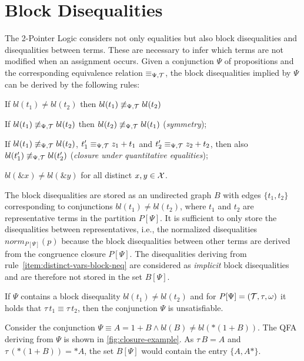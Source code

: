 \section{Block Disequalities}\label{section:block-disequalities}

The 2-Pointer Logic considers not only equalities but also block disequalities and disequalities between terms.
These are necessary to infer which terms are not
modified when an assignment occurs.
Given a conjunction $\Psi$ of propositions and the corresponding equivalence relation $\equiv_{\Psi,\mathcal{T}}$, the block disequalities implied by $\Psi$ can be derived by the following rules:

\begin{enumerate}[label={[B\arabic*]}, ref={[B\arabic*]}]
    \setcounter{enumi}{-1} %
    \item If $bl(t_1)\neq bl(t_2)$ then $bl(t_1)\not\equiv_{\Psi,\mathcal{T}} bl(t_2)$
    \item If $bl(t_1)\not\equiv_{\Psi,\mathcal{T}} bl(t_2)$ then $bl(t_2)\not\equiv_{\Psi,\mathcal{T}} bl(t_1)$
          (\emph{symmetry});
          \item\label{item:closure-under-quantitative-equalities}
          If $bl(t_1)\not\equiv_{\Psi,\mathcal{T}} bl(t_2)$, $t'_1 \equiv_{\Psi,\mathcal{T}} z_1+t_1$ and $t'_2\equiv_{\Psi,\mathcal{T}} z_2+t_2$, then
          also $bl(t'_1)\not\equiv_{\Psi,\mathcal{T}} bl(t'_2)$ (\emph{closure under quantitative equalities});
          \item\label{item:distinct-vars-block-neq} $bl(\&x) \neq bl(\&y)$ for all distinct $x, y \in \mathcal{X}$.
\end{enumerate}

The block disequalities are stored as an undirected graph $B$
with edges $\{t_1,t_2\}$ corresponding to conjunctions $bl(t_1) \neq bl(t_2)$,
where $t_1$ and $t_2$ are representative terms in the partition $P[\Psi]$.
It is sufficient to only store the disequalities between representatives, i.e.,
the normalized disequalities $norm_{P[\Psi]}(p)$ because
the block disequalities between other terms are derived from the congruence closure $P[\Psi]$.
The disequalities deriving from rule~\ref{item:distinct-vars-block-neq} are considered as \emph{implicit} block disequalities and are therefore not stored in the set $B[\Psi]$.

If $\Psi$ contains a block disequality $bl(t_1) \neq bl(t_2)$ and for $P[\Psi] = (\mathcal{T}, \tau, \omega)$ it holds that
$\tau\,t_1 \equiv \tau\,t_2$, then the conjunction $\Psi$ is unsatisfiable.

\begin{example}
    Consider the conjunction $\Psi \equiv A = 1 + B \land bl(B) \neq bl(*(1 + B))$.
    The QFA deriving from $\Psi$ is shown in \cref{fig:closure-example}.
    As $\tau\,B = A$ and $\tau\,(*(1+B)) = *A$, the set $B[\Psi]$ would contain the entry $\{A,A*\}$.
\end{example}

